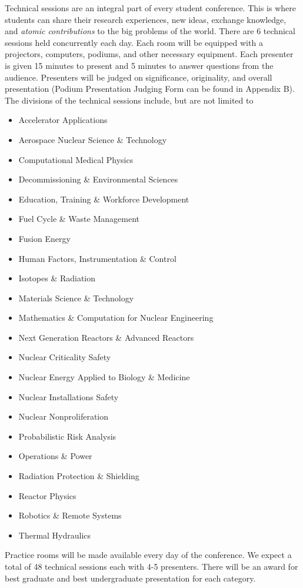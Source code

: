 Technical sessions are an integral part of every student conference. This is where students can share their research experiences, new ideas, exchange knowledge, and \textit{atomic contributions} to the big problems of the world. There are 6 technical sessions held concurrently each day. Each room will be equipped with a projectors, computers, podiums, and other necessary equipment. Each presenter is given 15 minutes to present and 5 minutes to answer questions from the audience. Presenters will be judged on significance, originality, and overall presentation (Podium Presentation Judging Form can be found in Appendix B). The divisions of the technical sessions include, but are not limited to
\begin{itemize}
	\item Accelerator Applications
	\item Aerospace Nuclear Science \& Technology
	\item Computational Medical Physics
	\item Decommissioning \& Environmental Sciences
	\item Education, Training \& Workforce Development
	\item Fuel Cycle \& Waste Management
	\item Fusion Energy
	\item Human Factors, Instrumentation \& Control
	\item Isotopes \& Radiation
	\item Materials Science \& Technology
	\item Mathematics \& Computation for Nuclear Engineering
	\item Next Generation Reactors \& Advanced Reactors
	\item Nuclear Criticality Safety
	\item Nuclear Energy Applied to Biology \& Medicine
	\item Nuclear Installations Safety
	\item Nuclear Nonproliferation
	\item Probabilistic Risk Analysis
	\item Operations \& Power
	\item Radiation Protection \& Shielding
	\item Reactor Physics
	\item Robotics \& Remote Systems
	\item Thermal Hydraulics
\end{itemize}
Practice rooms will be made available every day of the conference. We expect a total of 48 technical sessions each with 4-5 presenters. There will be an award for best graduate and best undergraduate presentation for each category.


